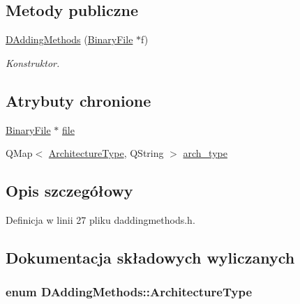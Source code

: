 \subsection*{Metody publiczne}
\begin{DoxyCompactItemize}
\item 
\hyperlink{class_d_adding_methods_aa00f1f94760a223807193314537b6651}{D\-Adding\-Methods} (\hyperlink{class_binary_file}{Binary\-File} $\ast$f)
\begin{DoxyCompactList}\small\item\em Konstruktor. \end{DoxyCompactList}\end{DoxyCompactItemize}
\subsection*{Atrybuty chronione}
\begin{DoxyCompactItemize}
\item 
\hyperlink{class_binary_file}{Binary\-File} $\ast$ \hyperlink{class_d_adding_methods_a87bdff1dd02ac26df6c10648fe406cd9}{file}
\item 
Q\-Map$<$ \hyperlink{class_d_adding_methods_a7d062c443c04f37689dbececc36cf4a3}{Architecture\-Type}, Q\-String $>$ \hyperlink{class_d_adding_methods_aa368755d8aba57f3a92877d1fbe925b3}{arch\-\_\-type}
\end{DoxyCompactItemize}


\subsection{Opis szczegółowy}


Definicja w linii 27 pliku daddingmethods.\-h.



\subsection{Dokumentacja składowych wyliczanych}
\hypertarget{class_d_adding_methods_a7d062c443c04f37689dbececc36cf4a3}{
\subsubsection[{Architecture\-Type}]{\setlength{\rightskip}{0pt plus 5cm}enum {\bf D\-Adding\-Methods\-::\-Architecture\-Type}}}\label{class_d_adding_methods_a7d062c443c04f37689dbececc36cf4a3}


